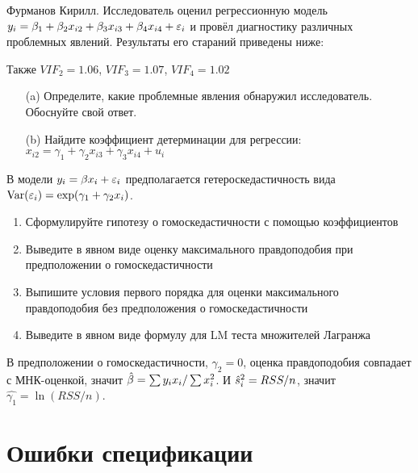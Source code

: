 \documentclass[pdftex,11pt,openany]{book}\usepackage[]{graphicx}\usepackage[]{color}
\begin{document}
\begin{problem}
Фурманов Кирилл. Исследователь оценил регрессионную модель $y_i = \beta_1 + \beta_2 x_{i2} + \beta_3 x_{i3} + \beta_4 x_{i4} + \varepsilon_i$ и провёл диагностику различных проблемных явлений. Результаты его стараний приведены ниже:



Также $VIF_2 = 1.06$, $VIF_3 = 1.07$, $VIF_4 = 1.02$
\begin{enumerate}
\item[(a)] Определите, какие проблемные явления обнаружил исследователь. Обоснуйте свой ответ.
\item[(b)] Найдите коэффициент детерминации для регрессии: $x_{i2} = \gamma_1 + \gamma_2 x_{i3} + \gamma_3 x_{i4} + u_i$
\end{enumerate}
\end{problem}


\begin{solution}
\end{solution}


\begin{problem}
В модели $y_i=\beta x_i+\varepsilon_i$ предполагается гетероскедастичность вида $\operatorname{Var}(\varepsilon_i)=\exp(\gamma_1+\gamma_2 x_i)$. 
\begin{enumerate}
\item Сформулируйте гипотезу о гомоскедастичности с помощью коэффициентов
\item Выведите в явном виде оценку максимального правдоподобия при предположении о гомоскедастичности
\item Выпишите условия первого порядка для оценки максимального правдоподобия без предположения о гомоскедастичности
\item Выведите в явном виде формулу для LM теста множителей Лагранжа
\end{enumerate}
\end{problem}

\begin{solution}
В предположении о гомоскедастичности, $\gamma_2=0$, оценка правдоподобия совпадает с МНК-оценкой, значит $\hat{\beta}=\sum y_i x_i/ \sum x_i^2$. И $\hat{s}^2_i=RSS/n$, значит $\hat{\gamma_1}=\ln(RSS/n)$.
\end{solution}





\chapter{Ошибки спецификации}
\end{document}
